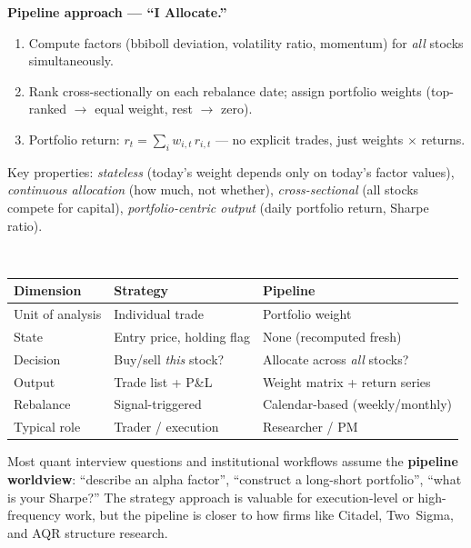 \documentclass[a4paper, 11pt]{report}
\theoremstyle{definition}
\theoremstyle{remark}
\begin{document}
\begin{description}[style=nextline, leftmargin=1.8cm]
        \medskip
        \textbf{Pipeline approach --- ``I Allocate.''}
        \begin{enumerate}[nosep]
            \item Compute factors (bbiboll deviation, volatility ratio,
                  momentum) for \emph{all} stocks simultaneously.
            \item Rank cross-sectionally on each rebalance date;
                  assign portfolio weights (top-ranked $\to$ equal weight,
                  rest $\to$ zero).
            \item Portfolio return:
                  $r_t = \sum_i w_{i,t}\, r_{i,t}$
                  --- no explicit trades, just weights $\times$ returns.
        \end{enumerate}
        Key properties: \emph{stateless} (today's weight depends only on
        today's factor values), \emph{continuous allocation} (how much,
        not whether), \emph{cross-sectional} (all stocks compete for
        capital), \emph{portfolio-centric output} (daily portfolio
        return, Sharpe ratio).

    \item[Summary Table]~\\[-\baselineskip]
        \begin{tabular}{@{}lll@{}}
        \toprule
        \textbf{Dimension} & \textbf{Strategy} & \textbf{Pipeline} \\
        \midrule
        Unit of analysis & Individual trade   & Portfolio weight \\
        State            & Entry price, holding flag & None (recomputed fresh) \\
        Decision         & Buy/sell \emph{this} stock? & Allocate across \emph{all} stocks? \\
        Output           & Trade list + P\&L   & Weight matrix + return series \\
        Rebalance        & Signal-triggered    & Calendar-based (weekly/monthly) \\
        Typical role      & Trader / execution  & Researcher / PM \\
        \bottomrule
        \end{tabular}

    \item[Why It Matters]
        Most quant interview questions and institutional workflows assume
        the \textbf{pipeline worldview}: ``describe an alpha factor'',
        ``construct a long-short portfolio'', ``what is your Sharpe?''
        The strategy approach is valuable for execution-level or
        high-frequency work, but the pipeline is closer to how
        firms like Citadel, Two~Sigma, and AQR structure research.


\end{description}
\end{document}
